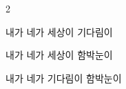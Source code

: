 \documentclass[fs9,seriesFre]{korfarm-base}
\begin{document}
\begin{kfSentenceUnit}{2}{}
\begin{kfChoices}
\kfChoice 내가
\kfChoice 네가
\kfChoice 세상이
\kfChoice 기다림이
\end{kfChoices}
\begin{kfChoices}
\kfChoice 내가
\kfChoice 네가
\kfChoice 세상이
\kfChoice 함박눈이
\end{kfChoices}
\begin{kfChoices}
\kfChoice 내가
\kfChoice 네가
\kfChoice 기다림이
\kfChoice 함박눈이
\end{kfChoices}
\end{kfSentenceUnit}

\kfEndMC

\end{document}
